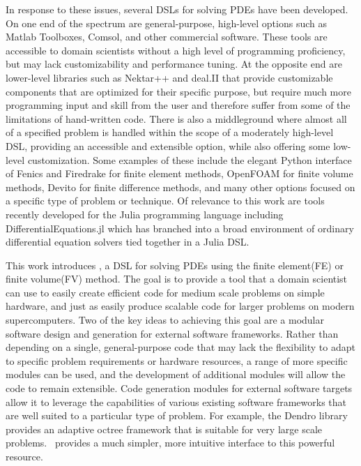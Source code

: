 \documentclass[twoside,leqno,twocolumn]{article}
\begin{document}
In response to these issues, several DSLs for solving PDEs have been developed. On one end of the spectrum are general-purpose, high-level options such as Matlab Toolboxes, Comsol, and other commercial software. These tools are accessible to domain scientists without a high level of programming proficiency, but may lack customizability and performance tuning. At the opposite end are lower-level libraries such as Nektar++\cite{nektar} and deal.II\cite{dealii} that provide customizable components that are optimized for their specific purpose, but require much more programming input and skill from the user and therefore suffer from some of the limitations of hand-written code. There is also a middleground where almost all of a specified problem is handled within the scope of a moderately high-level DSL, providing an accessible and extensible option, while also offering some low-level customization. Some examples of these include the elegant Python interface of Fenics\cite{fenics} and Firedrake\cite{firedrake} for finite element methods, OpenFOAM\cite{openfoam} for finite volume methods, Devito\cite{devito} for finite difference methods, and many other options focused on a specific type of problem or technique. Of relevance to this work are tools recently developed for the Julia programming language including DifferentialEquations.jl\cite{diffeqjl} which has branched into a broad environment of ordinary differential equation solvers tied together in a Julia DSL. 

This work introduces \FMshop, a DSL for solving PDEs using the finite element(FE) or finite volume(FV) method. The goal is to provide a tool that a domain scientist can use to easily create efficient code for medium scale problems on simple hardware, and just as easily produce scalable code for larger problems on modern supercomputers. Two of the key ideas to achieving this goal are a modular software design and generation for external software frameworks. Rather than depending on a single, general-purpose code that may lack the flexibility to adapt to specific problem requirements or hardware resources, a range of more specific modules can be used, and the development of additional modules will allow the code to remain extensible. Code generation modules for external software targets allow it to leverage the capabilities of various existing software frameworks that are well suited to a particular type of problem. For example, the Dendro library\cite{dendro} provides an adaptive octree framework that is suitable for very large scale problems. \FMshop\ provides a much simpler, more intuitive interface to this powerful resource.
\end{document}
